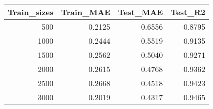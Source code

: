 \begin{tabular}{rrrr}
\toprule
Train_sizes & Train_MAE & Test_MAE & Test_R2 \\
\midrule
500 & 0.2125 & 0.6556 & 0.8795 \\
1000 & 0.2444 & 0.5519 & 0.9135 \\
1500 & 0.2562 & 0.5040 & 0.9271 \\
2000 & 0.2615 & 0.4768 & 0.9362 \\
2500 & 0.2668 & 0.4518 & 0.9423 \\
3000 & 0.2019 & 0.4317 & 0.9465 \\
\bottomrule
\end{tabular}
